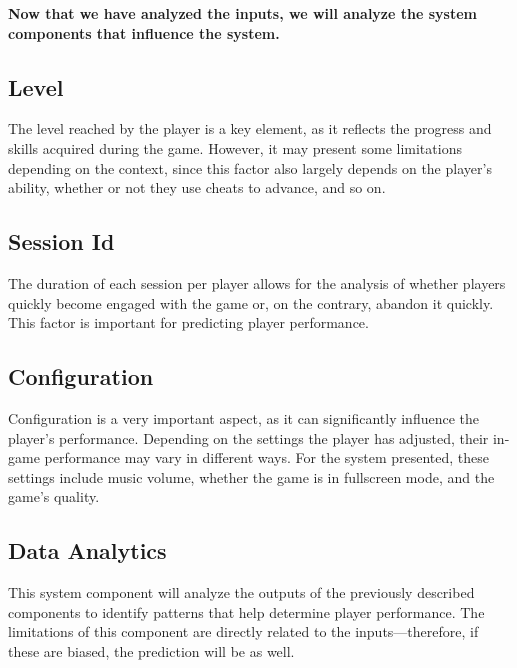 \documentclass{article}
\begin{document}
  \textbf{Now that we have analyzed the inputs, we will analyze the system components that influence the system.}
  
  \subsection*{Level}
  The level reached by the player is a key element, as it reflects the progress and skills acquired during the game. However, it may present some limitations depending on the context, since this factor also largely depends on the player's ability, whether or not they use cheats to advance, and so on.
  
  \subsection*{Session Id}
  The duration of each session per player allows for the analysis of whether players quickly become engaged with the game or, on the contrary, abandon it quickly. This factor is important for predicting player performance.
  
  \subsection*{Configuration}
  Configuration is a very important aspect, as it can significantly influence the player's performance. Depending on the settings the player has adjusted, their in-game performance may vary in different ways. For the system presented, these settings include music volume, whether the game is in fullscreen mode, and the game’s quality.
  
  \subsection*{Data Analytics}
  This system component will analyze the outputs of the previously described components to identify patterns that help determine player performance. The limitations of this component are directly related to the inputs—therefore, if these are biased, the prediction will be as well.
  
\end{document}
